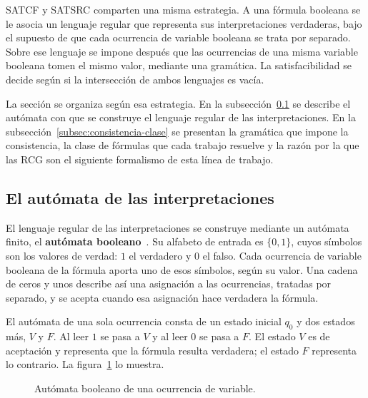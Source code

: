 SATCF y SATSRC comparten una misma estrategia. A una fórmula booleana se
le asocia un lenguaje regular que representa sus interpretaciones
verdaderas, bajo el supuesto de que cada ocurrencia de variable booleana se trata
por separado. Sobre ese lenguaje se impone después que las ocurrencias
de una misma variable booleana tomen el mismo valor, mediante una gramática. La
satisfacibilidad se decide según si la intersección de ambos lenguajes
es vacía.

La sección se organiza según esa estrategia. En la
subsección~\ref{subsec:automata-interpretaciones} se describe el
autómata con que se construye el lenguaje regular de las
interpretaciones. En la subsección~\ref{subsec:consistencia-clase} se
presentan la gramática que impone la consistencia, la clase de fórmulas
que cada trabajo resuelve y la razón por la que las RCG son el
siguiente formalismo de esta línea de trabajo.

\subsection{El autómata de las interpretaciones}
\label{subsec:automata-interpretaciones}

El lenguaje regular de las interpretaciones se construye mediante un
autómata finito, el \textbf{autómata
booleano}~\cite{fernandezarias2007}. Su alfabeto de entrada es
$\{0,1\}$, cuyos símbolos son los valores de verdad: $1$ el verdadero y
$0$ el falso. Cada ocurrencia de variable booleana de la fórmula aporta uno de
esos símbolos, según su valor. Una cadena de ceros y unos describe así
una asignación a las ocurrencias, tratadas por separado, y se acepta
cuando esa asignación hace verdadera la fórmula.

El autómata de una sola ocurrencia consta de un estado inicial $q_0$ y
dos estados más, $V$ y $F$. Al leer $1$ se pasa a $V$ y al leer $0$ se
pasa a $F$. El estado $V$ es de aceptación y representa que la fórmula
resulta verdadera; el estado $F$ representa lo contrario. La
figura~\ref{fig:automata-base} lo muestra.

\begin{figure}[ht]
\centering
{}
\caption{Autómata booleano de una ocurrencia de variable.}
\label{fig:automata-base}
\end{figure}

